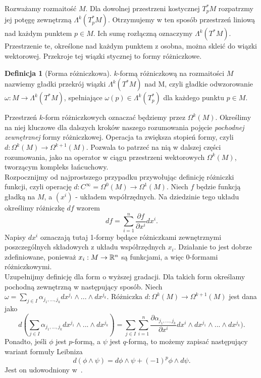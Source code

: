 \documentclass[licencjacka]{pracamgr}
\theoremstyle{definition}
\newtheorem{definition}{Definicja}[section]
\theoremstyle{definition}
\theoremstyle{plain}
\theoremstyle{plain}
\theoremstyle{plain}
\theoremstyle{plain}
\theoremstyle{plain}
\def\M{\ensuremath M}
\def\R{\ensuremath\mathbb{R}}
\begin{document}
Rozważamy rozmaitość $M$. Dla dowolnej przestrzeni kostycznej 
$T_p^\ast M$ rozpatrzmy jej potęgę zewnętrzną $\Lambda^k(T_p^\ast M)$.
Otrzymujemy w ten sposób przestrzeń liniową nad każdym punktem $p \in M$.
Ich sumę rozłączną oznaczymy $\Lambda^k(T^\ast M)$. Przestrzenie te,
określone nad każdym punktem z osobna, można skleić do wiązki wektorowej.
Przekroje tej wiązki stycznej to formy różniczkowe. \\

\begin{definition}[Forma różniczkowa]
  $k$-formą różniczkową na rozmaitości $M$ nazwiemy gładki przekrój wiązki
  $\Lambda^k(T^\ast M)$ nad M, czyli gładkie odwzorowanie $\omega: M \rightarrow
  \Lambda^k (T^\ast M)$, spełniające $\omega(p) \in \Lambda^k(T_p^\ast)$ dla
  każdego punktu $p \in M$.
\end{definition}

Przestrzeń $k$-form różniczkowych oznaczać będziemy przez $\Omega^k(M)$. 
Określimy na niej kluczowe dla dalszych kroków naszego rozumowania pojęcie
\emph{pochodnej zewnętrznej} formy różniczkowej. Operacja ta zwiększa stopień
formy, czyli $d: \Omega^k(M) \rightarrow \Omega^{k+1} (M)$. Pozwala to patrzeć
na nią w dalszej części rozumowania, jako na operator w ciągu przestrzeni
wektorowych $\Omega^k(M)$, tworzącym kompleks łańcuchowy. \\

Rozpocznijmy od najprostszego przypadku przywołując definicję różniczki
funkcji, czyli operację $d: C^\infty = \Omega^0(M) \rightarrow \Omega^1(M)$.
Niech $f$ będzie funkcją gładką na $M$, a $(x^i)$ -  układem współrzędnych. Na
dziedzinie tego układu określimy różniczkę $df$ wzorem
\begin{equation}\label{exterior-derivative-for-one-forms}
df = \sum_{i=1}^n \frac{\partial f}{\partial x^i} dx^i.
\end{equation} 
Napisy $dx^i$ oznaczają tutaj 1-formy będące różniczkami zewnętrznymi
poszczególnych składowych z układu współrzędnych $x_i$. Działanie to jest
dobrze zdefiniowane, ponieważ $x_i: \M \rightarrow \R^n$ są funkcjami, a więc
0-formami różniczkowymi.  \\

Uzupełnijmy definicję dla form o wyższej gradacji. Dla takich form określamy
pochodną zewnętrzną w następujący sposób. Niech 
$\omega = \sum_{j \in I} \alpha_{j_1, ..., j_k} dx^{j_1} \wedge ... \wedge dx^{j_k}$.
Różniczka $d: \Omega^k(M) \rightarrow \Omega^{k+1}(M)$ jest dana jako
\[ %
d( \sum_{j \in I} \alpha_{j_1, ..., j_k} dx^{j_1} \wedge ... \wedge dx^{j_k}) = 
 \sum_{j \in I} \sum_{i=1}^n
 \frac{ \partial \alpha_{j_1, ..., j_k}} {\partial x^i} dx^i
                            \wedge dx^{j_1} \wedge ... \wedge dx^{j_k}).
\]
Ponadto, jeśli $\phi$ jest $p$-formą, a $\psi$ jest $q$-formą, to możemy
zapisać następujący wariant formuły Leibniza
\[
d(\phi \wedge \psi) = d\phi \wedge \psi + (-1)^p \phi \wedge d\psi.
\]
Jest on udowodniony w~\cite[Proposition 14.23 (b)]{lee}. \\
\end{document}
